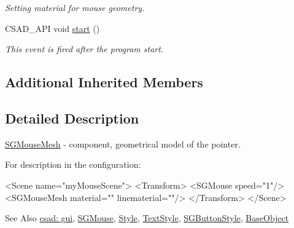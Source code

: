 \begin{DoxyCompactItemize}
\begin{DoxyCompactList}\small\item\em Setting material for mouse geometry. \end{DoxyCompactList}\item 
\hypertarget{classcsad_1_1_s_g_mouse_mesh_afe05b3cbdc3e2485c1d91e3c00c59f4a}{C\-S\-A\-D\-\_\-\-A\-P\-I void \hyperlink{classcsad_1_1_s_g_mouse_mesh_afe05b3cbdc3e2485c1d91e3c00c59f4a}{start} ()}\label{classcsad_1_1_s_g_mouse_mesh_afe05b3cbdc3e2485c1d91e3c00c59f4a}

\begin{DoxyCompactList}\small\item\em This event is fired after the program start. \end{DoxyCompactList}\end{DoxyCompactItemize}
\subsection*{Additional Inherited Members}


\subsection{Detailed Description}
\hyperlink{classcsad_1_1_s_g_mouse_mesh}{S\-G\-Mouse\-Mesh} -\/ component, geometrical model of the pointer. 

For description in the configuration\-: \begin{DoxyVerb}  <Scene name="myMouseScene">
    <Transform>
      <SGMouse speed="1"/>
      <SGMouseMesh material="" linematerial=""/>
    </Transform>
  </Scene>
\end{DoxyVerb}


\begin{DoxySeeAlso}{See Also}
\hyperlink{group__scenegui}{csad\-: gui}, \hyperlink{classcsad_1_1_s_g_mouse}{S\-G\-Mouse}, \hyperlink{classcsad_1_1_style}{Style}, \hyperlink{classcsad_1_1_text_style}{Text\-Style}, \hyperlink{classcsad_1_1_s_g_button_style}{S\-G\-Button\-Style}, \hyperlink{classcsad_1_1_base_object}{Base\-Object} 
\end{DoxySeeAlso}

